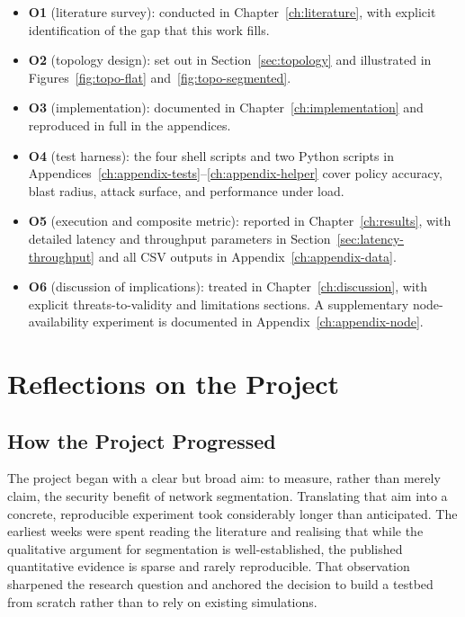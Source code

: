 \begin{itemize}[leftmargin=*]
    \item \textbf{O1} (literature survey): conducted in Chapter~\ref{ch:literature}, with explicit identification of the gap that this work fills.
    \item \textbf{O2} (topology design): set out in Section~\ref{sec:topology} and illustrated in Figures~\ref{fig:topo-flat} and~\ref{fig:topo-segmented}.
    \item \textbf{O3} (implementation): documented in Chapter~\ref{ch:implementation} and reproduced in full in the appendices.
    \item \textbf{O4} (test harness): the four shell scripts and two Python scripts in Appendices~\ref{ch:appendix-tests}--\ref{ch:appendix-helper} cover policy accuracy, blast radius, attack surface, and performance under load.
    \item \textbf{O5} (execution and composite metric): reported in Chapter~\ref{ch:results}, with detailed latency and throughput parameters in Section~\ref{sec:latency-throughput} and all CSV outputs in Appendix~\ref{ch:appendix-data}.
    \item \textbf{O6} (discussion of implications): treated in Chapter~\ref{ch:discussion}, with explicit threats-to-validity and limitations sections. A supplementary node-availability experiment is documented in Appendix~\ref{ch:appendix-node}.
\end{itemize}

\section{Reflections on the Project}
\label{sec:reflections}

\subsection{How the Project Progressed}

The project began with a clear but broad aim: to measure, rather than merely claim, the security benefit of network segmentation. Translating that aim into a concrete, reproducible experiment took considerably longer than anticipated. The earliest weeks were spent reading the literature and realising that while the qualitative argument for segmentation is well-established, the published quantitative evidence is sparse and rarely reproducible. That observation sharpened the research question and anchored the decision to build a testbed from scratch rather than to rely on existing simulations.

